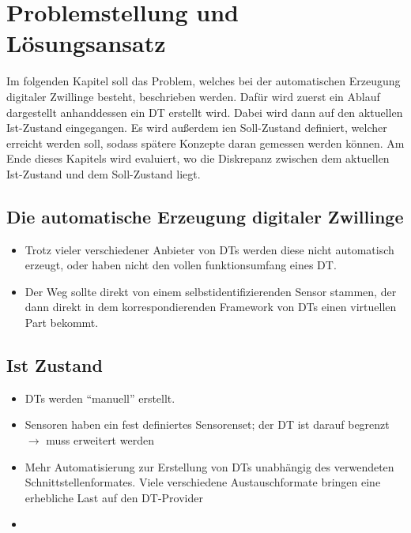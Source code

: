 \chapter{Problemstellung und Lösungsansatz}

Im folgenden Kapitel soll das Problem, welches bei der automatischen Erzeugung digitaler Zwillinge besteht, beschrieben werden. Dafür wird zuerst ein Ablauf dargestellt anhanddessen ein \ac{DT} erstellt wird. Dabei wird dann auf den aktuellen Ist-Zustand eingegangen. Es wird außerdem ien Soll-Zustand definiert, welcher erreicht werden soll, sodass spätere Konzepte daran gemessen werden können. Am Ende dieses Kapitels wird evaluiert, wo die Diskrepanz zwischen dem aktuellen Ist-Zustand und dem Soll-Zustand liegt.

\section{Die automatische Erzeugung digitaler Zwillinge}


\begin{itemize}
    \item Trotz vieler verschiedener Anbieter von DTs werden diese nicht automatisch erzeugt, oder haben nicht den vollen funktionsumfang eines DT.
    \item Der Weg sollte direkt von einem selbstidentifizierenden Sensor stammen, der dann direkt in dem korrespondierenden Framework von DTs einen virtuellen Part bekommt.
\end{itemize}

\section{Ist Zustand}

\begin{itemize}
    \item DTs werden \enquote{manuell} erstellt.
    \item Sensoren haben ein fest definiertes Sensorenset; der DT ist darauf begrenzt $\rightarrow$ muss erweitert werden
    \item Mehr Automatisierung zur Erstellung von DTs unabhängig des verwendeten Schnittstellenformates. Viele verschiedene Austauschformate bringen eine erhebliche Last auf den DT-Provider
    \item 
\end{itemize}